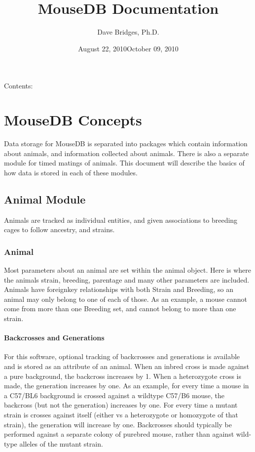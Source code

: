 \documentclass[letterpaper,10pt,english]{sphinxmanual}
\title{MouseDB Documentation}
\date{August 22, 2010}
\date{October 09, 2010}
\author{Dave Bridges, Ph.D.}
\begin{document}
\maketitle
\tableofcontents
{}\label{index::doc}


Contents:


\chapter{MouseDB Concepts}
\label{concepts:welcome-to-mousedb-s-documentation}\label{concepts::doc}\label{concepts:mousedb-concepts}
Data storage for MouseDB is separated into packages which contain information about animals, and information collected about animals.  There is also a separate module for timed matings of animals.  This document will describe the basics of how data is stored in each of these modules.


\section{Animal Module}
\label{concepts:animal-module}
Animals are tracked as individual entities, and given associations to breeding cages to follow ancestry, and strains.


\subsection{Animal}
\label{concepts:animal}
Most parameters about an animal are set within the animal object.  Here is where the animals strain, breeding, parentage and many other parameters are included.  Animals have foreignkey relationships with both Strain and Breeding, so an animal may only belong to one of each of those.  As an example, a mouse cannot come from more than one Breeding set, and cannot belong to more than one strain.


\subsubsection{Backcrosses and Generations}
\label{concepts:backcrosses-and-generations}
For this software, optional tracking of backcrosses and generations is available and is stored as an attribute of an animal.  When an inbred cross is made against a pure background, the backcross increases by 1.  When a heterozygote cross is made, the generation increases by one.  As an example, for every time a mouse in a C57/BL6 background is crossed against a wildtype C57/B6 mouse, the backcross (but not the generation) increases by one.  For every time a mutant strain is crosses against itself (either vs a heterozygote or homozygote of that strain), the generation will increase by one.  Backcrosses should typically be performed against a separate colony of purebred mouse, rather than against wild-type alleles of the mutant strain.
\end{document}
